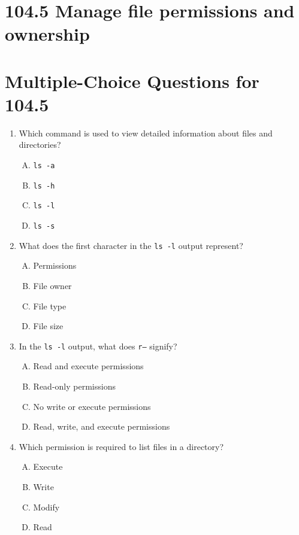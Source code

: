 \documentclass[a4paper]{report}
\begin{document}
\section*{104.5 Manage file permissions and ownership}

\newpage
\section*{Multiple-Choice Questions for 104.5}
\begin{enumerate}[1.]

    \item Which command is used to view detailed information about files and directories?  
    \begin{enumerate}[A)]
        \item \texttt{ls -a}  
        \item \texttt{ls -h}  
        \item \texttt{ls -l}  
        \item \texttt{ls -s}  
    \end{enumerate}

    \item What does the first character in the \texttt{ls -l} output represent?  
    \begin{enumerate}[A)]
        \item Permissions  
        \item File owner  
        \item File type  
        \item File size  
    \end{enumerate}

    \item In the \texttt{ls -l} output, what does \texttt{r--} signify?  
    \begin{enumerate}[A)]
        \item Read and execute permissions  
        \item Read-only permissions  
        \item No write or execute permissions  
        \item Read, write, and execute permissions  
    \end{enumerate}

    \item Which permission is required to list files in a directory?  
    \begin{enumerate}[A)]
        \item Execute  
        \item Write  
        \item Modify  
        \item Read  
    \end{enumerate}


\end{enumerate}
\end{document}
